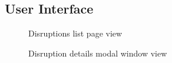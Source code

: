 \subsection{User Interface}
\begin{figure}[ht!]
	\caption{Disruptions list page view}
\label{fig:ui1}
\end{figure}

\begin{figure}[ht!]
	\caption{Disruption details modal window view}
\label{fig:ui2}
\end{figure}

